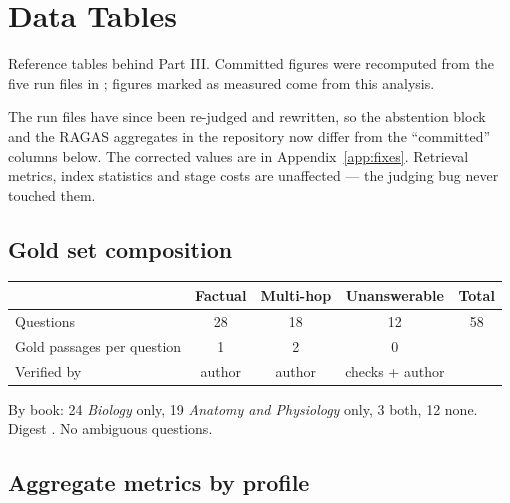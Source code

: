 \chapter{Data Tables}
\label{app:data}

Reference tables behind Part III. Committed figures were recomputed from the five run files in ; figures marked as measured come from this analysis.

\begin{caution}
The run files have since been re-judged and rewritten, so the abstention block and the RAGAS aggregates in the repository now differ from the \enquote{committed} columns below. The corrected values are in Appendix~\ref{app:fixes}. Retrieval metrics, index statistics and stage costs are unaffected --- the judging bug never touched them.
\end{caution}

\section{Gold set composition}

\begin{center}\small
\begin{tabular}{@{}lcccc@{}}
\toprule
& \textbf{Factual} & \textbf{Multi-hop} & \textbf{Unanswerable} & \textbf{Total}\\
\midrule
Questions & 28 & 18 & 12 & 58\\
Gold passages per question & 1 & 2 & 0 & \\
Verified by & author & author & checks + author & \\
\bottomrule
\end{tabular}
\end{center}

By book: 24 \emph{Biology} only, 19 \emph{Anatomy and Physiology} only, 3 both, 12 none. Digest . No ambiguous questions.

\section{Aggregate metrics by profile}

